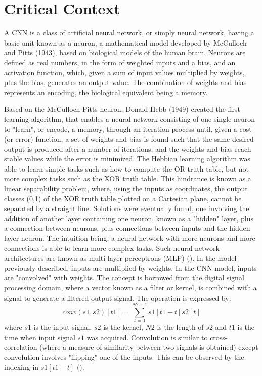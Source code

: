 \section{Critical Context}

A CNN is a class of artificial neural network, or simply neural network, having a basic unit known as a neuron, a mathematical model developed by McCulloch and Pitts (1943), based on biological models of the human brain. Neurons are defined as real numbers, in the form of weighted inputs and a bias, and an activation function, which, given a sum of input values multiplied by weights, plus the bias, generates an output value. The combination of weights and bias represents an encoding, the biological equivalent being a memory. 

Based on the McCulloch-Pitts neuron, Donald Hebb (1949) created the first learning algorithm, that enables a neural network consisting of one single neuron to "learn", or encode, a memory, through an iteration process until, given a cost (or error) function, a set of weights and bias is found such that the same desired output is produced after a number of iterations, and the weights and bias reach stable values while the error is minimized. The Hebbian learning algorithm was able to learn simple tasks such as how to compute the OR truth table, but not more complex tasks such as the XOR truth table. This hindrance is known as a linear separability problem, where, using the inputs as coordinates, the output classes (0,1) of the XOR truth table plotted on a Cartesian plane, cannot be separated by a straight line. Solutions were eventually found, one involving the addition of another layer containing one neuron, known as a "hidden" layer, plus a connection between neurons, plus connections between inputs and the hidden layer neuron. The intuition being, a neural network with more neurons and more connections is able to learn more complex tasks. Such neural network architectures are known as multi-layer perceptrons (MLP) (\cite{Garcez}).  
In the model previously described, inputs are multiplied by weights. In the CNN model, inputs are "convolved" with weights. The concept is borrowed from the digital signal processing domain, where a vector known as a filter or kernel, is combined with a signal to generate a filtered output signal. The operation is expressed by:
\begin{equation}
\label{eqn:1dconv}
conv(s1,s2)[t1]=\sum_{t=0}^{N2-1} s1[t1-t]s2[t]    
\end{equation}
where $s1$ is the input signal, $s2$ is the kernel, $N2$ is the length of $s2$ and $t1$ is the time when input signal $s1$ was acquired. Convolution is similar to cross-correlation (where a measure of similarity between two signals is obtained) except convolution involves "flipping" one of the inputs. This can be observed by the indexing in $s1[t1-t]$ (\cite{Pauwels}). 

